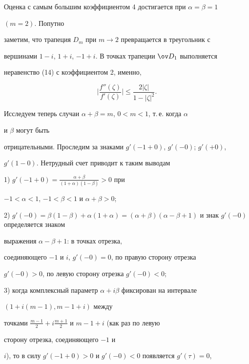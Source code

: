 Оценка с самым большим коэффициентом 4 достигается при $\alpha=\beta=1$


$(m=2)$. Попутно


заметим, что трапеция $D_m$ при $m\to 2$ превращается в треугольник с


вершинами $1-i$, $1+i$, $-1+i$. В точках трапеции $\ov D_1$ выполняется


неравенство (14) с коэффициентом 2, именно,


\begin{equation}


\biggl|\frac{f''(\zeta)}{f'(\zeta)}\biggr|\le


\frac{2|\zeta|}{1-|\zeta|^2}.


\end{equation}





Исследуем теперь случаи $\alpha+\beta=m$, $0<m<1$, т.\,е. когда $\alpha$


и $\beta$ могут быть


отрицательными. Проследим за знаками $g'(-1+0)$, $g'(-0)$; $g'(+0)$,


$g'(1-0)$. Нетрудный счет приводит к таким выводам





1) $g'(-1+0)=\frac{\alpha+\beta}{(1+\alpha)(1-\beta)}>0$ при


$-1<\alpha<1$, $-1<\beta<1$ и $\alpha+\beta>0$;





2) $g'(-0)=\beta(1-\beta)+\alpha(1+\alpha)=


(\alpha+\beta)(\alpha-\beta+1)$ и знак $g'(-0)$ определяется знаком


выражения $\alpha-\beta+1$: в точках отрезка,


соединяющего $-1$ и $i$, $g'(-0)=0$, по правую сторону отрезка


$g'(-0)>0$, по левую сторону отрезка $g'(-0)<0$;





3) когда комплексный параметр $\alpha+i\beta$ фиксирован на интервале


$(1+i(m-1),m-1+i)$ между


точками $\frac{m-1}{2}+i\frac{m+1}{2}$ и $m-1+i$ (как раз по левую


сторону отрезка, соединяющего $-1$ и


$i$), то в силу $g'(-1+0)>0$ и $g'(-0)<0$ появляется $g'(\tau)=0$,


